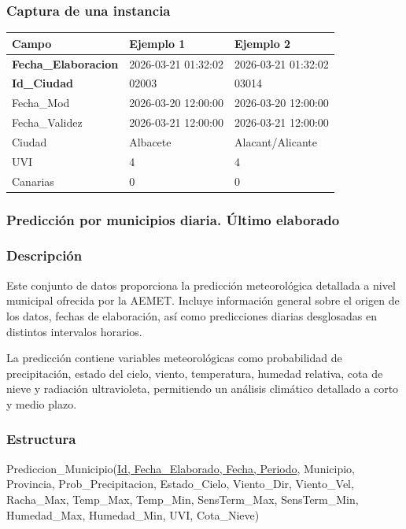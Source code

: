 \documentclass[12pt, a4paper]{article}
\begin{document}
\subsubsection*{Captura de una instancia}
\begin{center}
\begin{tabular}{|p{}|p{}|p{}|}
\hline
\textbf{Campo} & \textbf{Ejemplo 1} & \textbf{Ejemplo 2} \\
\hline
\textbf{Fecha\_Elaboracion} & 2026-03-21 01:32:02 & 2026-03-21 01:32:02 \\
\textbf{Id\_Ciudad} & 02003 & 03014 \\
Fecha\_Mod & 2026-03-20 12:00:00 & 2026-03-20 12:00:00 \\
Fecha\_Validez & 2026-03-21 12:00:00 & 2026-03-21 12:00:00 \\
Ciudad & Albacete & Alacant/Alicante \\
UVI & 4 & 4 \\
Canarias & 0 & 0 \\
\hline
\end{tabular}
\end{center}

\subsubsection{Predicción por municipios diaria. Último elaborado}

\subsubsection*{Descripción}
Este conjunto de datos proporciona la predicción meteorológica detallada a nivel municipal ofrecida por la AEMET. 
Incluye información general sobre el origen de los datos, fechas de elaboración, así como predicciones diarias desglosadas en distintos intervalos horarios.

La predicción contiene variables meteorológicas como probabilidad de precipitación, estado del cielo, viento, temperatura, humedad relativa, cota de nieve y radiación ultravioleta, permitiendo un análisis climático detallado a corto y medio plazo.

\subsubsection*{Estructura}
Prediccion\_Municipio(\underline{Id, Fecha\_Elaborado, Fecha, Periodo}, Municipio, Provincia, Prob\_Precipitacion, Estado\_Cielo, Viento\_Dir, Viento\_Vel, Racha\_Max, Temp\_Max, Temp\_Min, SensTerm\_Max, SensTerm\_Min, Humedad\_Max, Humedad\_Min, UVI, Cota\_Nieve)
\end{document}

